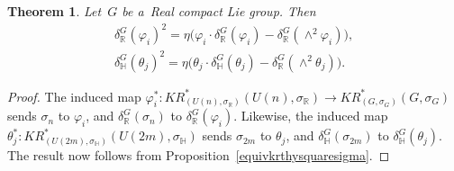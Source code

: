 \documentclass[pdftex]{sigma}
\numberwithin{equation}{section}
\newtheorem{Theorem}{Theorem}[section]
\begin{document}
\begin{Theorem}
\label{equivkrthysquare}
Let~$G$ be a~Real compact Lie group.
Then
\begin{gather}
\label{realsquare}
\delta_\mathbb{R}^G(\varphi_i)^2
=\eta\big(\varphi_i\cdot\delta_\mathbb{R}^G(\varphi_i)-\delta_\mathbb{R}^G(\wedge^2\varphi_i)\big),
\\
\label{quatsquare}
\delta_\mathbb{H}^G(\theta_j)^2
=\eta\big(\theta_j\cdot\delta_\mathbb{H}^G(\theta_j)-\delta_\mathbb{R}^G(\wedge^2\theta_j)\big).
\end{gather}
\end{Theorem}
\begin{proof}
The induced map $\varphi_i^*: KR^*_{(U(n),
\sigma_\mathbb{R})}(U(n),
\sigma_\mathbb{R})\to KR^*_{(G,
\sigma_G)}
(G,
\sigma_G)$ sends $\sigma_n$ to $\varphi_i$, and $\delta_\mathbb{R}^G(\sigma_n)$ to $\delta_\mathbb{R}^G(\varphi_i)$.
Likewise, the induced map $\theta_j^*: KR^*_{(U(2m),
\sigma_\mathbb{H})}(U(2m),
\sigma_\mathbb{H})$ sends $\sigma_{2m}$ to $\theta_j$, and $\delta_\mathbb{H}^G(\sigma_{2m})$ to $\delta_\mathbb{H}^G(\theta_j)$.
The result now follows from Proposition~\ref{equivkrthysquaresigma}.
\end{proof}
\end{document}
